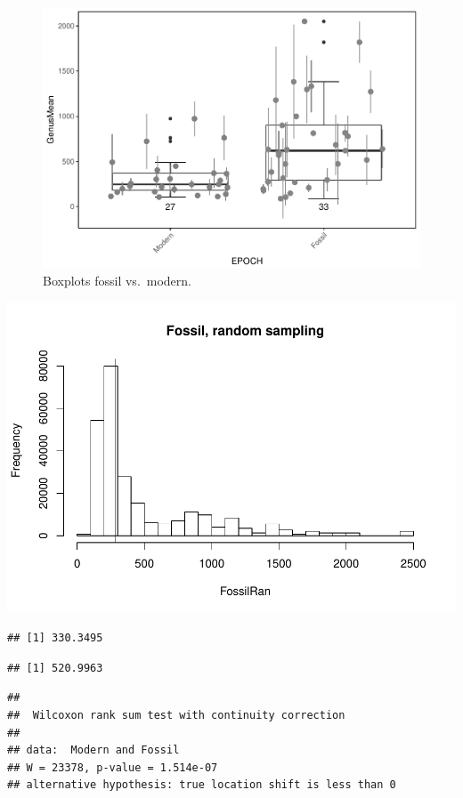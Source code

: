 \documentclass[]{article}
\begin{document}
\begin{figure}[htbp]
\centering
\includegraphics{MA_JJ_files/figure-latex/BPMF-1.pdf}
\caption{Boxplots fossil vs.~modern.}
\end{figure}

\includegraphics{MA_JJ_files/figure-latex/RSFM-1.pdf}

\begin{verbatim}
## [1] 330.3495
\end{verbatim}

\begin{verbatim}
## [1] 520.9963
\end{verbatim}

\begin{verbatim}
## 
##  Wilcoxon rank sum test with continuity correction
## 
## data:  Modern and Fossil
## W = 23378, p-value = 1.514e-07
## alternative hypothesis: true location shift is less than 0
\end{verbatim}
\end{document}
